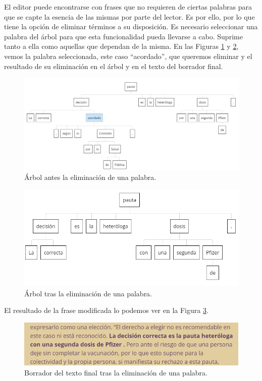 El editor puede encontrarse con frases que no requieren de ciertas palabras para que se capte la esencia de las mismas por parte del lector. Es por ello, por lo que tiene la opción de eliminar términos a su disposición. Es necesario seleccionar una palabra del árbol para que esta funcionalidad pueda llevarse a cabo. Suprime tanto a ella como aquellas que dependan de la misma. En las Figuras \ref{fig:eliminacionPrevia} y \ref{fig:eliminacion}, vemos la palabra seleccionada, este caso ``acordado'', que queremos eliminar y el resultado de su eliminación en el árbol y en el texto del borrador final.
	 \begin{figure}[h!]
	\centering
	
	
	\includegraphics[scale=0.6]{Imagenes/Figuras/EleccionEliminacion}
	
	
	\caption{Árbol antes la eliminación de una palabra.}
	\label{fig:eliminacionPrevia}
\end{figure} 
	 \begin{figure}[h!]
	\centering
	
	
	\includegraphics[scale=0.9]{Imagenes/Figuras/EliminacionSubarbol}
	
	
	\caption{Árbol tras la eliminación de una palabra.}
	\label{fig:eliminacion}
\end{figure} 
El resultado de la frase modificada lo podemos ver en la Figura \ref{fig:resultadoEliminar}.
	 \begin{figure}[h!]
	\centering
	
	
	\includegraphics[scale=1]{Imagenes/Figuras/BorradorEliminacion}
	
	
	\caption{Borrador del texto final tras la eliminación de una palabra.}
	\label{fig:resultadoEliminar}
\end{figure} 

